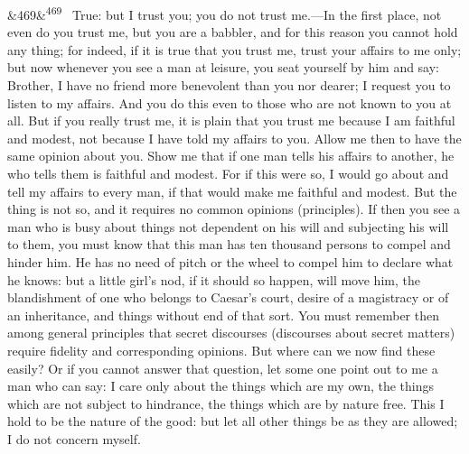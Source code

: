\documentclass[12pt]{article}
\newcommand{\para}[1][]{\par\noindent\ifx&#1&\else\textsuperscript{\footnotesize #1}~\fi}
\begin{document}
\para[469] True: but I trust you; you do not trust me.—In the first place, not even do you trust me, but you are a babbler, and for this reason you cannot hold any thing; for indeed, if it is true that you trust me, trust your affairs to me only; but now whenever you see a man at leisure, you seat yourself by him and say: Brother, I have no friend more benevolent than you nor dearer; I request you to listen to my affairs. And you do this even to those who are not known to you at all. But if you really trust me, it is plain that you trust me because I am faithful and modest, not because I have told my affairs to you. Allow me then to have the same opinion about you. Show me that if one man tells his affairs to another, he who tells them is faithful and modest. For if this were so, I would go about and tell my affairs to every man, if that would make me faithful and modest. But the thing is not so, and it requires no common opinions (principles). If then you see a man who is busy about things not dependent on his will and subjecting his will to them, you must know that this man has ten thousand persons to compel and hinder him. He has no need of pitch or the wheel to compel him to declare what he knows: but a little girl's nod, if it should so happen, will move him, the blandishment of one who belongs to Caesar's court, desire of a magistracy or of an inheritance, and things without end of that sort. You must remember then among general principles that secret discourses (discourses about secret matters) require fidelity and corresponding opinions. But where can we now find these easily? Or if you cannot answer that question, let some one point out to me a man who can say: I care only about the things which are my own, the things which are not subject to hindrance, the things which are by nature free. This I hold to be the nature of the good: but let all other things be as they are allowed; I do not concern myself.
\end{document}
